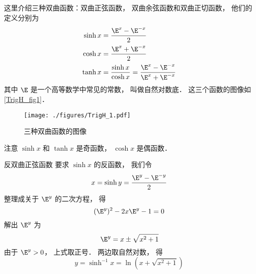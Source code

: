 

这里介绍三种双曲函数：双曲正弦函数， 双曲余弦函数和双曲正切函数， 他们的定义分别为
\begin{align}
\sinh x &= \frac{\E^x - \E^{-x}}{2}\\
\cosh x &= \frac{\E^x + \E^{-x}}{2}\\
\tanh x &= \frac{\sinh x}{\cosh x} = \frac{\E^x - \E^{-x}}{\E^x + \E^{-x}}
\end{align}
其中 $\E$ 是一个高等数学中常见的常数， 叫做自然对数底． 这三个函数的图像如\autoref{TrigH_fig1}．

\begin{figure}[ht]
\centering
\texttt{[image: ./figures/TrigH\_1.pdf]}
\caption{三种双曲函数的图像} \label{TrigH_fig1}
\end{figure}

注意 $\sinh x$ 和 $\tanh x$ 是奇函数， $\cosh x$ 是偶函数．

\begin{example}{反双曲正弦函数}\label{TrigH_ex1}
要求 $\sinh x$ 的反函数， 我们令
\begin{equation}
x = \sinh y =  \frac{\E^y - \E^{-y}}{2}
\end{equation}
整理成关于 $\E^y$ 的二次方程， 得
\begin{equation}
(\E^y)^2 - 2x \E^y - 1 = 0
\end{equation}
解出 $\E^y$ 为
\begin{equation}
\E^y = x \pm \sqrt{x^2 + 1}
\end{equation}
由于 $\E^y > 0$， 上式取正号． 两边取自然对数， 得
\begin{equation}
y = \sinh^{-1} x = \ln(x + \sqrt{x^2 + 1})
\end{equation}
\end{example}

